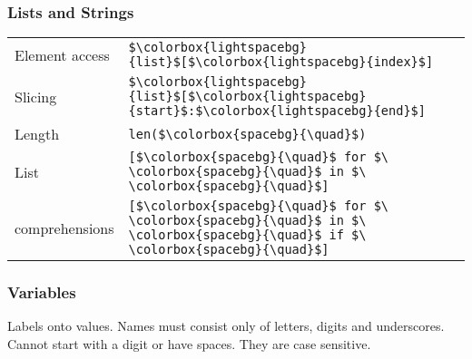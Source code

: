 \documentclass[12pt,twocolumn]{article}
\begin{document}
	\subsubsection*{Lists and Strings}
	
	\begin{tabular}{l l}
		Element access &
		\colorbox{codebg}{\lstinline|$\colorbox{lightspacebg}{list}$[$\colorbox{lightspacebg}{index}$]|} \vspace{1mm} \\
		
		Slicing &
		\colorbox{codebg}{\lstinline|$\colorbox{lightspacebg}{list}$[$\colorbox{lightspacebg}{start}$:$\colorbox{lightspacebg}{end}$]|} \vspace{1mm} \\
		
		Length &
		\colorbox{codebg}{\lstinline|len($\colorbox{spacebg}{\quad}$)|} \vspace{1mm} \\
		
		List &
		\colorbox{codebg}{\lstinline|[$\colorbox{spacebg}{\quad}$ for $\ \colorbox{spacebg}{\quad}$ in $\ \colorbox{spacebg}{\quad}$]|} \\
		
		comprehensions &
		\colorbox{codebg}{\lstinline|[$\colorbox{spacebg}{\quad}$ for $\ \colorbox{spacebg}{\quad}$ in $\ \colorbox{spacebg}{\quad}$ if $\ \colorbox{spacebg}{\quad}$]|}\\
	\end{tabular}
	
	\subsubsection*{Variables}
	
	Labels onto values. Names must consist only of letters, digits and underscores. Cannot start with a digit or have spaces. They are case sensitive.
	
	\vspace{\baselineskip}
	
\end{document}

